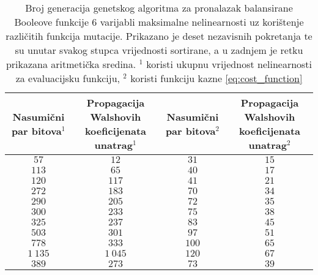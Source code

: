 \begin{table}[]
    \centering
    \captionsetup{justification=centering}
    \caption{Broj generacija genetskog algoritma za pronalazak balansirane Booleove funkcije $6$ varijabli maksimalne nelinearnosti uz korištenje različitih funkcija mutacije. Prikazano je deset nezavisnih pokretanja te su unutar svakog stupca vrijednosti sortirane, a u zadnjem je retku prikazana aritmetička sredina. \newline
    \footnotesize{$^1$ koristi ukupnu vrijednost nelinearnosti za evaluacijsku funkciju, $^2$ koristi funkciju kazne \eqref{eq:cost_function}} }
    \begin{tabular}{cccc} \hline
        \makecell{Nasumični \\ par bitova$^1$} & \makecell{Propagacija Walshovih \\ koeficijenata unatrag$^1$} & \makecell{Nasumični \\ par bitova$^2$} & \makecell{Propagacija Walshovih \\ koeficijenata unatrag$^2$} \\ \hline
            $57$ &     $12$ &  $31$ & $15$ \\
           $113$ &     $65$ &  $40$ & $17$ \\
           $120$ &    $117$ &  $41$ & $21$ \\
           $272$ &    $183$ &  $70$ & $34$ \\
           $290$ &    $205$ &  $72$ & $35$ \\
           $300$ &    $233$ &  $75$ & $38$ \\
           $325$ &    $237$ &  $83$ & $45$ \\
           $503$ &    $301$ &  $97$ & $51$ \\
           $778$ &    $333$ & $100$ & $65$ \\
        $1\:135$ & $1\:045$ & $120$ & $67$ \\ \hline
           $389$ &    $273$ &  $73$ & $39$
    \end{tabular}
    \label{tbl:ga_6_bal}
\end{table}

